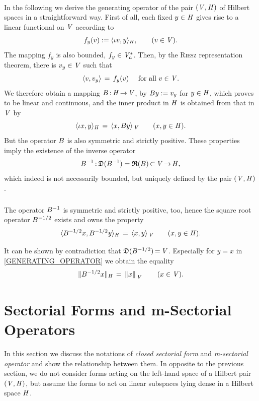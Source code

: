 \documentclass[11pt,twoside]{article}
\begin{document}
\paragraph{} %
In the following we derive the generating operator
of the pair $(\mathit{V},\mathit{H})$ of Hilbert spaces in a straightforward way.
First of all,
each fixed $y \in \mathit{H}$
gives rise to a linear functional on $\mathit{V}$ according to
\[
f_y(v) := \langle \iota v,y \rangle_{\mathit{H}}, \quad \quad (v \in \mathit{V}).
\]
The mapping $f_y$ is also bounded,
{\ie} $f_y \in \mathit{V}_a^*$.
Then,
by the \textsc{Riesz} representation theorem,
there is $v_y \in \mathit{V}$ such that
\[
\langle v,v_y \rangle \,=\, f_y(v) \quad \mbox{ for all } v \in \mathit{V}.
\]
We therefore obtain a mapping ${B} {\,:\,} \mathit{H} {\,\to\,} \mathit{V}$,
by ${B} y := v_y$ for $y \in \mathit{H}$,
which proves to be linear and continuous,
and the inner product in $\mathit{H}$ is obtained from that in $\mathit{V}$ by
\[
\langle \iota x,y \rangle_{\mathit{H}} \,=\, \langle x,{B} y \rangle_{\,\mathit{V}}
\quad \quad (x,y \in \mathit{H}).
\]
But the operator ${B}$ is also symmetric and strictly positive.
These properties imply the existence of the inverse operator
\[
{B}^{-1} {\,:\,} \mathfrak{D}({B}^{-1} ) = \mathfrak{R}({B}) {\,\subset\,} \mathit{V} {\,\to\,} \mathit{H},
\]
which indeed is not necessarily bounded,
but uniquely defined by the pair $(\mathit{V},\mathit{H})$.

\subparagraph{}
The operator ${B}^{-1}$ is symmetric and strictly positive,
too,
hence the square root operator ${B}^{-1/2}$ exists and owns the property
\begin{equation}\label{GENERATING_OPERATOR}
\langle {B}^{-1/2} x,{B}^{-1/2} y \rangle_{\mathit{H}} \,=\, \langle x,y \rangle_{\,\mathit{V}}
\quad \quad (x,y \in \mathit{H}).
\end{equation}

It can be shown by contradiction
that $\mathfrak{D}({B}^{-1/2}) {\,=\,} \mathit{V}$.
Especially for $y=x$ in \eqref{GENERATING_OPERATOR} we obtain the equality
\[
\lVert {B}^{-1/2}x \rVert_{\mathit{H}} \,=\, \left\lVert x \right\rVert_{\,\mathit{V}}
\quad \quad (x \in \mathit{V}).
\]

\section{Sectorial Forms and m-Sectorial Operators}                            %
In this section we discuss the notations of \textit{closed sectorial form}
and \textit{m-sectorial operator} and show the relationship between them.
In opposite to the previous section,
we do not consider forms acting on the left-hand space
of a Hilbert pair $(\mathit{V},\mathit{H})$,
but assume the forms to act on linear subspaces
lying dense in a Hilbert space $\mathit{H}$.
\end{document}
